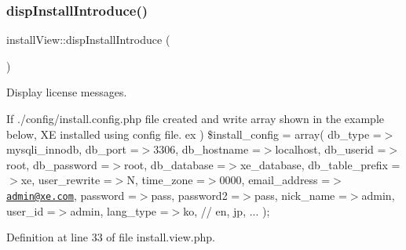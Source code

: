 \subsubsection{\texorpdfstring{disp\+Install\+Introduce()}{dispInstallIntroduce()}}
{\footnotesize\ttfamily install\+View\+::disp\+Install\+Introduce (\begin{DoxyParamCaption}{ }\end{DoxyParamCaption})}



Display license messages. 

If \textquotesingle{}./config/install.config.\+php\textquotesingle{} file created and write array shown in the example below, XE installed using config file. ex ) \$install\+\_\+config = array( \textquotesingle{}db\+\_\+type\textquotesingle{} =$>$\textquotesingle{}mysqli\+\_\+innodb\textquotesingle{}, \textquotesingle{}db\+\_\+port\textquotesingle{} =$>$\textquotesingle{}3306\textquotesingle{}, \textquotesingle{}db\+\_\+hostname\textquotesingle{} =$>$\textquotesingle{}localhost\textquotesingle{}, \textquotesingle{}db\+\_\+userid\textquotesingle{} =$>$\textquotesingle{}root\textquotesingle{}, \textquotesingle{}db\+\_\+password\textquotesingle{} =$>$\textquotesingle{}root\textquotesingle{}, \textquotesingle{}db\+\_\+database\textquotesingle{} =$>$\textquotesingle{}xe\+\_\+database\textquotesingle{}, \textquotesingle{}db\+\_\+table\+\_\+prefix\textquotesingle{} =$>$\textquotesingle{}xe\textquotesingle{}, \textquotesingle{}user\+\_\+rewrite\textquotesingle{} =$>$\textquotesingle{}N\textquotesingle{}, \textquotesingle{}time\+\_\+zone\textquotesingle{} =$>$\textquotesingle{}0000\textquotesingle{}, \textquotesingle{}email\+\_\+address\textquotesingle{} =$>$\textquotesingle{}\href{mailto:admin@xe.com}{\tt admin@xe.\+com}\textquotesingle{}, \textquotesingle{}password\textquotesingle{} =$>$\textquotesingle{}pass\textquotesingle{}, \textquotesingle{}password2\textquotesingle{} =$>$\textquotesingle{}pass\textquotesingle{}, \textquotesingle{}nick\+\_\+name\textquotesingle{} =$>$\textquotesingle{}admin\textquotesingle{}, \textquotesingle{}user\+\_\+id\textquotesingle{} =$>$\textquotesingle{}admin\textquotesingle{}, \textquotesingle{}lang\+\_\+type\textquotesingle{} =$>$\textquotesingle{}ko\textquotesingle{}, // en, jp, ... );

Definition at line 33 of file install.\+view.\+php.

\hypertarget{classinstallView_a7182430aaf7f9fb4c8e18d21e9e5a4e7}{}\label{classinstallView_a7182430aaf7f9fb4c8e18d21e9e5a4e7} 
